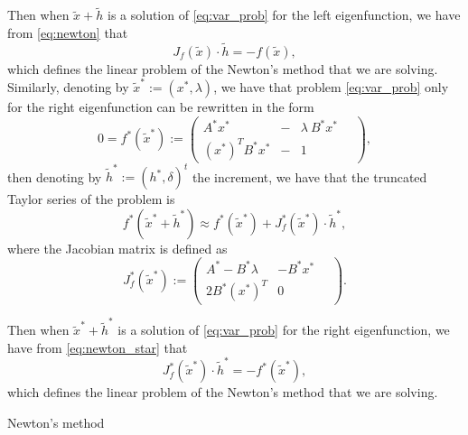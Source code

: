 \documentclass[smallextended]{svjour3}
\begin{document}
Then when $\tilde x + \tilde h$ is a solution of \eqref{eq:var_prob} for the left eigenfunction, we have from \eqref{eq:newton}
that 
$$
J_f(\tilde x)\cdot \tilde h = - f(\tilde x),
$$
which defines the linear problem of the Newton's method that we are solving.
Similarly, denoting by $\tilde x^*:=(x^*,\lambda)$, we have that problem \eqref{eq:var_prob} only for the right eigenfunction can be rewritten in the form
$$
0=f^*(\tilde x^*):=
\left(
\begin{array}{lcl}
A^* x^*&-& \lambda\ B^*x^*
\\
  (x^*)^T B^*x^*&-& 1
\end{array}\quad
\right) ,
$$
then denoting by $\tilde h^*:=(h^*, \delta)^t$ the increment, we have that the truncated Taylor series of the problem is
\begin{equation}\label{eq:newton_star}
f^*(\tilde x^* + \tilde h^*)\approx f^*(\tilde x^*) + J_f^*(\tilde x^*)\cdot \tilde h^*, 
\end{equation}
where the Jacobian matrix is defined as
$$
J_f^*(\tilde x^*):=
\left(
\begin{array}{lr}
A^* - B^*\lambda & -B^*x^*
\\
  2B^*(x^*)^T  & 0
\end{array}\quad
\right) .
$$

Then when $\tilde x^* + \tilde h^*$ is a solution of \eqref{eq:var_prob} for the right eigenfunction, we have from \eqref{eq:newton_star}
that 
$$
J_f^*(\tilde x^*)\cdot \tilde h^* = - f^*(\tilde x^*),
$$
which defines the linear problem of the Newton's method that we are solving.






\begin{algorithm}[!ht] \caption{Newton's method} \label{alg:newton} 
\begin{algorithmic}


\REPEAT

\end{algorithmic}
\end{algorithm}
\end{document}
